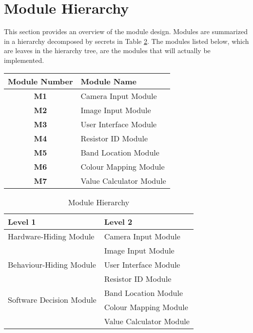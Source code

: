 \documentclass[12pt, titlepage]{article}
\begin{document}
\section{Module Hierarchy} \label{SecMH}

This section provides an overview of the module design. Modules are summarized
in a hierarchy decomposed by secrets in Table \ref{TblMH}. The modules listed
below, which are leaves in the hierarchy tree, are the modules that will
actually be implemented.

\begin{table}[h]
\centering
\label{my-label}
\begin{tabular}{cl}
\hline
\multicolumn{1}{l}{\textbf{Module Number}} & \textbf{Module Name}    \\ \hline
\textbf{M1}                                & Camera Input Module     \\ \hline
\textbf{M2}                                & Image Input Module      \\ \hline
\textbf{M3}                                & User Interface Module   \\ \hline
\textbf{M4}                                & Resistor ID Module      \\ \hline
\textbf{M5}                                & Band Location Module    \\ \hline
\textbf{M6}                                & Colour Mapping Module   \\ \hline
\textbf{M7}                                & Value Calculator Module \\ \hline
\end{tabular}
\end{table}

\begin{table}[h!]
\centering
\begin{tabular}{p{} p{}}
\toprule
\textbf{Level 1} & \textbf{Level 2}\\
\midrule

{Hardware-Hiding Module} 
& Camera Input Module\\
& Image Input Module \\
\midrule

\multirow{1}{0.3\textwidth}{Behaviour-Hiding Module}
& User Interface Module\\
\midrule

\multirow{4}{0.3\textwidth}{Software Decision Module}
& Resistor ID Module \\
& Band Location Module \\
& Colour Mapping Module \\
& Value Calculator Module\\
\bottomrule

\end{tabular}
\caption{Module Hierarchy}
\label{TblMH}
\end{table}
\end{document}
